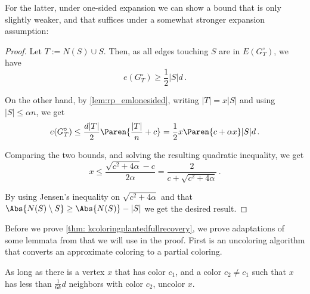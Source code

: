 For the latter, under one-sided expansion we can show a bound that is only slightly weaker, and that suffices under a somewhat stronger expansion assumption:


\begin{proof}
    Let $T:=N(S)\cup S$.
    Then, as all edges touching $S$ are in $E(G_T^{\circ})$, we have
    $$e(G_T^{\circ})\geq \frac{1}{2}|S|d\,.$$ 

    On the other hand, by \cref{lem:rp_emlonesided}, writing $|T|=x|S|$ and using $|S|\leq \alpha n$, we get
    $$e(G_T^{\circ})\leq \frac{d|T|}{2}\Paren{\frac{|T|}{n}+c}=\frac{1}{2}x\Paren{c+\alpha x}|S|d\,.$$

    Comparing the two bounds, and solving the resulting quadratic inequality, we get 
    $$x\leq \frac{\sqrt{c^2 + 4\alpha}-c}{2\alpha}=\frac{2}{c+\sqrt{c^2+4\alpha}}\,.$$

    By using Jensen's inequality on $\sqrt{c^2+4\alpha}$ and that $\Abs{N(S)\setminus S}\geq \Abs{N(S)}-|S|$ we get the desired result.
\end{proof}

Before we prove \cref{thm: kcoloringplantedfullrecovery}, we prove adaptations of some lemmata from \cite{MR3536556-David16} that we will use in the proof. First is an uncoloring algorithm that converts an approximate coloring to a partial coloring.

\begin{algorithm}[H]
    As long as there is a vertex $x$ that has color $c_1$, and a color $c_2\neq c_1$ such that $x$ has less than $\frac{1}{6k}d$ neighbors with color $c_2$, uncolor $x$.
    \protect\caption{\label{alg:rp_uncoloring}Uncoloring Algorithm (Adaptation of Algorithm 5 of \cite{MR3536556-David16})}
\end{algorithm}




